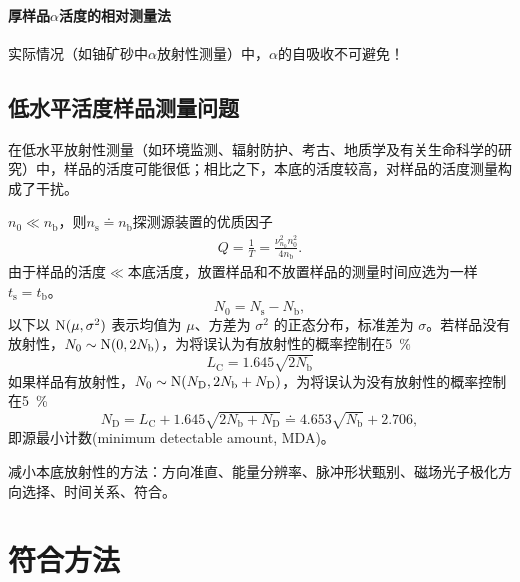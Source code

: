 \paragraph{厚样品$\alpha$活度的相对测量法}
实际情况（如铀矿砂中$\alpha$放射性测量）中，$\alpha$的自吸收不可避免！

\subsection{低水平活度样品测量问题}

在低水平放射性测量（如环境监测、辐射防护、考古、地质学及有关生命科学的研究）中，样品的活度可能很低；相比之下，本底的活度较高，对样品的活度测量构成了干扰。

$n_0 \ll n_\mathrm b$，则$n_\mathrm s \doteq n_{\mathrm{b}}$探测源装置的优质因子
\begin{align}
	Q = \frac1T = \frac{\nu_{n_0}^2n_0^2}{4n_\mathrm b}.
\end{align}
由于样品的活度$\ll$本底活度，放置样品和不放置样品的测量时间应选为一样$t_\mathrm s = t_\mathrm b$。
\[
	N_0 = N_\mathrm s - N_\mathrm b,
\]
以下以 $\operatorname{N}(\mu,\sigma^2)$ 表示均值为 $\mu$、方差为 $\sigma^2$ 的正态分布，标准差为 $\sigma$。若样品没有放射性，$N_0 \sim \operatorname{N}(0,2N_\mathrm b)$，为将误认为有放射性的概率控制在\qty{5}{\percent}
\begin{equation}\label{eq:nrd-critical-count-level}
	L_\mathrm C = 1.645\sqrt{2 N_\mathrm b}
\end{equation}
如果样品有放射性，$N_0 \sim \operatorname{N}(N_\mathrm D,2N_\mathrm b + N_\mathrm D)$，为将误认为没有放射性的概率控制在\qty{5}{\percent}
\begin{equation}\label{eq:nrd-detection-limit}
	N_\mathrm D = L_\mathrm C + 1.645\sqrt{2N_\mathrm b + N_\mathrm D} \doteq 4.653\sqrt{N_\mathrm b} + 2.706,
\end{equation}
即源最小计数(minimum detectable amount, MDA)。

减小本底放射性的方法：方向准直、能量分辨率、脉冲形状甄别、磁场光子极化方向选择、时间关系、符合。

\section{符合方法}

